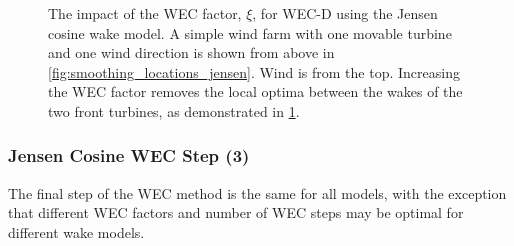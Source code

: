 \documentclass{jpconf}
\begin{document}
\begin{figure}[h!]
\begin{subfigure}[t]{0.47\textwidth}
		\caption{}
		\label{fig:smoothing_jensen_wec_d}
	\end{subfigure}
	\caption{The impact of the WEC factor, $\xi$, for WEC-D using the Jensen cosine wake model. A simple wind farm with one movable turbine and one wind direction is shown from above in \cref{fig:smoothing_locations_jensen}. Wind is from the top. Increasing the WEC factor removes the local optima between the wakes of the two front turbines, as demonstrated in \cref{fig:smoothing_jensen_wec_d}.}
	\label{fig:wec_jensen_wec_d}
\end{figure}

\subsubsection{Jensen Cosine WEC Step (3)}

The final step of the WEC method is the same for all models, with the exception that different WEC factors and number of WEC steps may be optimal for different wake models.

%
%
\end{document}
